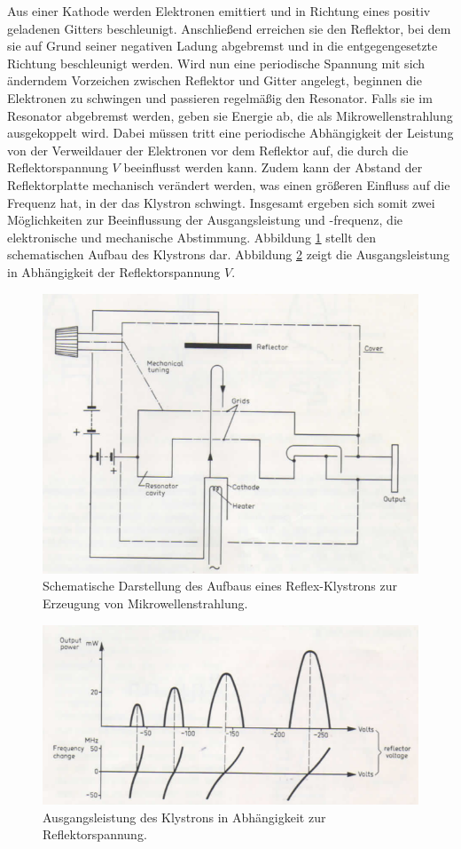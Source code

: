 Aus einer Kathode werden Elektronen emittiert und in Richtung eines positiv
geladenen Gitters beschleunigt.
Anschließend erreichen sie den Reflektor, bei dem sie auf Grund seiner
negativen Ladung abgebremst und in die entgegengesetzte Richtung beschleunigt
werden.
Wird nun eine periodische Spannung mit sich änderndem Vorzeichen zwischen
Reflektor und Gitter angelegt, beginnen die Elektronen zu schwingen und
passieren regelmäßig den Resonator.
Falls sie im Resonator abgebremst werden, geben sie Energie ab, die als
Mikrowellenstrahlung ausgekoppelt wird.
Dabei müssen tritt eine periodische Abhängigkeit der Leistung
von der Verweildauer der Elektronen vor dem Reflektor auf, die durch die
Reflektorspannung $V$ beeinflusst werden kann.
Zudem kann der Abstand der Reflektorplatte mechanisch verändert werden,
was einen größeren Einfluss auf die Frequenz hat, in der das Klystron schwingt.
Insgesamt ergeben sich somit zwei Möglichkeiten zur Beeinflussung der
Ausgangsleistung und -frequenz, die elektronische und mechanische Abstimmung.
Abbildung \ref{fig:aufbau} stellt den schematischen Aufbau des Klystrons dar.
Abbildung \ref{fig:output} zeigt die Ausgangsleistung in Abhängigkeit der
Reflektorspannung $V$.
\begin{figure}[p]
    \centering
    \includegraphics[width=0.9\linewidth]{img/aufbau.png}
    \caption{
        Schematische Darstellung des Aufbaus eines Reflex-Klystrons
        zur Erzeugung von Mikrowellenstrahlung.
    }
    \label{fig:aufbau}
\end{figure}
\begin{figure}[p]
    \centering
    \includegraphics[width=0.9\linewidth]{img/output.png}
    \caption{
        Ausgangsleistung des Klystrons in Abhängigkeit zur Reflektorspannung.
    }
    \label{fig:output}
\end{figure}

\clearpage
